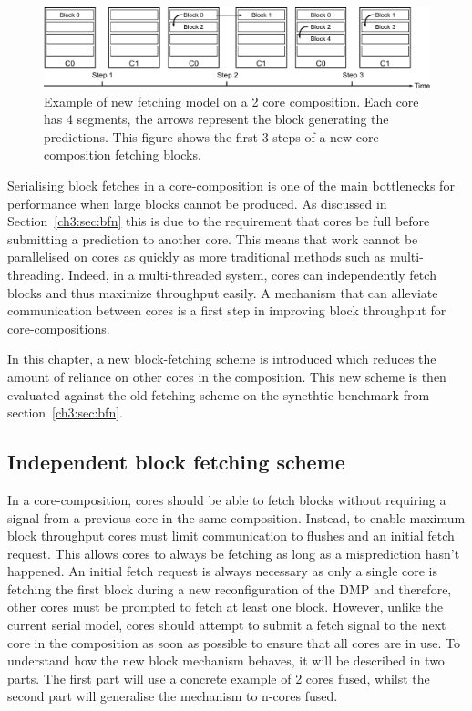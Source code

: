 
\begin{figure}[t]
    \centering
    \includegraphics[width=1\textwidth]{chapter3/graphics/fetching-model.pdf}

    \caption{Example of new fetching model on a 2 core composition. Each core has 4 segments, the arrows represent the block generating the predictions. This figure shows the first 3 steps of a new core composition fetching blocks.}
    \label{fig:new_fetch_ex}
\end{figure}
Serialising block fetches in a core-composition is one of the main bottlenecks for performance when large blocks cannot be produced.
As discussed in Section~\ref{ch3:sec:bfn} this is due to the requirement that cores be full before submitting a prediction to another core.
This means that work cannot be parallelised on cores as quickly as more traditional methods such as multi-threading.
Indeed, in a multi-threaded system, cores can independently fetch blocks and thus maximize throughput easily.
A mechanism that can alleviate communication between cores is a first step in improving block throughput for core-compositions.

In this chapter, a new block-fetching scheme is introduced which reduces the amount of reliance on other cores in the composition.
This new scheme is then evaluated against the old fetching scheme on the synethtic benchmark from section~\ref{ch3:sec:bfn}.

\subsection{Independent block fetching scheme}

In a core-composition, cores should be able to fetch blocks without requiring a signal from a previous core in the same composition.
Instead, to enable maximum block throughput cores must limit communication to flushes and an initial fetch request.
This allows cores to always be fetching as long as a misprediction hasn't happened.
An initial fetch request is always necessary as only a single core is fetching the first block during a new reconfiguration of the DMP and therefore, other cores must be prompted to fetch at least one block.
However, unlike the current serial model, cores should attempt to submit a fetch signal to the next core in the composition as soon as possible to ensure that all cores are in use.
To understand how the new block mechanism behaves, it will be described in two parts.
The first part will use a concrete example of 2 cores fused, whilst the second part will generalise the mechanism to n-cores fused.

